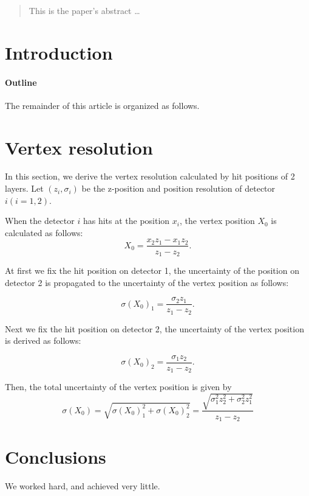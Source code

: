 \documentclass[12pt]{article}
\begin{document}
\maketitle

\begin{abstract}
This is the paper's abstract \ldots
\end{abstract}

\section{Introduction}

\paragraph{Outline}
The remainder of this article is organized as follows.


\section{Vertex resolution}
In this section, we derive the vertex resolution calculated by hit positions of 2 layers. 
Let $(z_i,\sigma_i)$ be the z-position and position resolution of detector $i (i=1,2)$.


When the detector $i$ has hits at the position $x_i$, the vertex position $X_0$ is calculated as follows:
\[
X_0 = \frac{x_2z_1 - x_1z_2}{z_1 - z_2}.
\]

At first we fix the hit position on detector 1, the uncertainty of the position on detector 2 is propagated to the uncertainty of the vertex position as follows:

\[
\sigma(X_0)_1 = \frac{\sigma_2z_1}{z_1 - z_2}.
\]

Next we fix the hit position on detector 2, the uncertainty of the vertex position is derived as follows:

\[
\sigma(X_0)_2 = \frac{\sigma_1z_2}{z_1 - z_2}.
\]

Then, the total uncertainty of the vertex position is given by 
\[
\sigma(X_0) = \sqrt{\sigma(X_0)_1^2+\sigma(X_0)_2^2} = \frac{\sqrt{\sigma_1^2z_2^2+\sigma_2^2z_1^2}} {z_1 - z_2} 
\]


\section{Conclusions}\label{conclusions}
We worked hard, and achieved very little.

%
%
\end{document}
